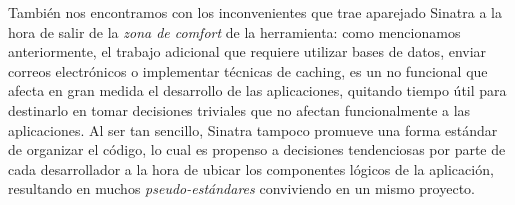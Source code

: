 También nos encontramos con los inconvenientes que trae aparejado Sinatra a la hora de salir de la \textit{zona de comfort} de la herramienta: como mencionamos anteriormente, el trabajo adicional que requiere utilizar bases de datos, enviar correos electrónicos o implementar técnicas de caching, es un  no funcional que afecta en gran medida el desarrollo de las aplicaciones, quitando tiempo útil para destinarlo en tomar decisiones triviales que no afectan funcionalmente a las aplicaciones. Al ser tan sencillo, Sinatra tampoco promueve una forma estándar de organizar el código, lo cual es propenso a decisiones tendenciosas por parte de cada desarrollador a la hora de ubicar los componentes lógicos de la aplicación, resultando en muchos \textit{pseudo-estándares} conviviendo en un mismo proyecto.
